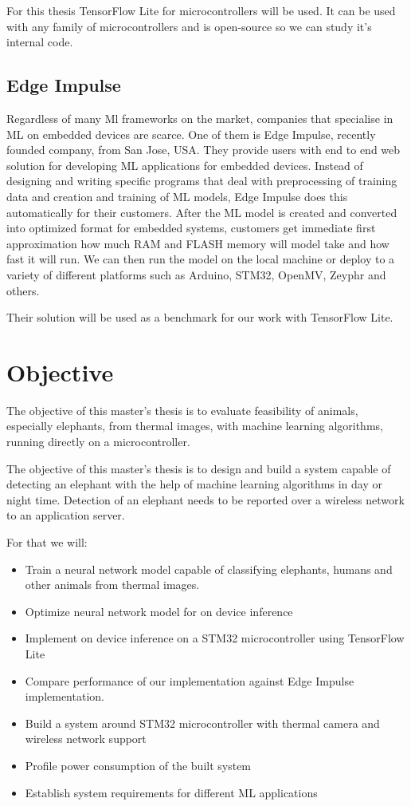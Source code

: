 For this thesis TensorFlow Lite for microcontrollers will be used. 
It can be used with any family of microcontrollers and is open-source so we can study it's internal code.


\subsection{ Edge Impulse}

Regardless of many Ml frameworks on the market, companies that specialise in ML on embedded devices are scarce.
One of them is Edge Impulse, recently founded company, from San Jose, USA.
They provide users with end to end web solution for developing ML applications for embedded devices.
Instead of designing and writing specific programs that deal with preprocessing of training data and creation and training of ML models, Edge Impulse does this automatically for their customers.
After the ML model is created and converted into optimized format for embedded systems, customers get immediate first approximation how much RAM and FLASH memory will model take and how fast it will run.
We can then run the model on the local machine or deploy to a variety of different platforms such as Arduino, STM32, OpenMV, Zeyphr and others.

Their solution will be used as a benchmark for our work with TensorFlow Lite.


\section{ Objective}

The objective of this master's thesis is to evaluate feasibility of  animals, especially elephants, from thermal images, with machine learning algorithms, running directly on a microcontroller.

The objective of this master's thesis is to design and build a system capable of detecting an elephant with the help of machine learning algorithms in day or night time.
Detection of an elephant needs to be reported over a wireless network to an application server.

For that we will:

\begin{itemize}
    \item Train a neural network model capable of classifying elephants, humans and other animals from thermal images.
    \item Optimize neural network model for on device inference
    \item Implement on device inference on a STM32 microcontroller using TensorFlow Lite
    \item Compare performance of our implementation against Edge Impulse implementation.
    \item Build a system around STM32 microcontroller with thermal camera and wireless network support
    \item Profile power consumption of the built system
    \item Establish system requirements for different ML applications
\end{itemize}


